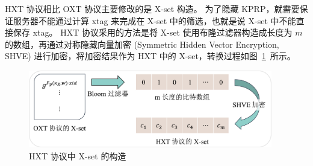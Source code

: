 HXT 协议相比 OXT 协议主要修改的是 X-set 构造。
为了隐藏 KPRP，就需要保证服务器不能通过计算 xtag 来完成在 X-set 中的筛选，也就是说 X-set 中不能直接保存 xtag。
HXT 协议采用的方法是将 X-set 使用布隆过滤器构造成长度为 $m$ 的数组，再通过对称隐藏向量加密 (Symmetric Hidden Vector Encryption, SHVE) 进行加密，将加密结果作为 HXT 中的 X-set，转换过程如图~\ref{fig:xset_example}~所示。
\begin{figure}[ht]
  \centering
  \includegraphics[width=0.95\textwidth]{figures/xset_exp.pdf}
  \caption{HXT 协议中 X-set 的构造}
  \label{fig:xset_example}
\end{figure}

